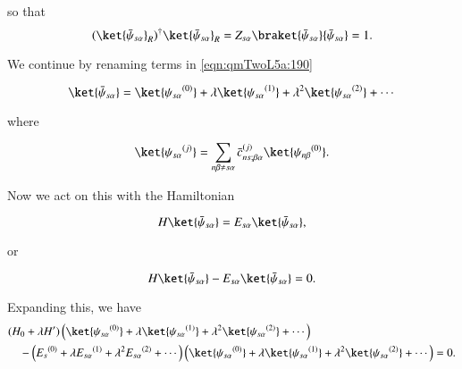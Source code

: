 so that
\begin{equation}\label{eqn:qmTwoL5a:270}
(\ket{\bar{\psi}_{s \alpha}}_R)^\dagger \ket{\bar{\psi}_{s \alpha}}_R = Z_{s \alpha} \braket{\bar{\psi}_{s \alpha}}{\bar{\psi}_{s \alpha}} = 1.
\end{equation}


We continue by renaming terms in \ref{eqn:qmTwoL5a:190}

\begin{equation}\label{eqn:qmTwoL5a:300}
\ket{\bar{\psi}_{s \alpha}} 
=
\ket{{\psi_{s \alpha}}^{(0)}} 
+ 
\lambda \ket{{\psi_{s \alpha}}^{(1)}} 
+ 
\lambda^2 \ket{{\psi_{s \alpha}}^{(2)}} 
+ \cdots
\end{equation}

where

\begin{equation}\label{eqn:qmTwoL5a:320}
\ket{{\psi_{s \alpha}}^{(j)}} = \sum_{n\beta \ne s\alpha} {\bar{c}_{ns;\beta \alpha}}^{(j)} \ket{{\psi_{n \beta}}^{(0)}}.
\end{equation}

Now we act on this with the Hamiltonian

\begin{equation}\label{eqn:qmTwoL5a:340}
H \ket{\bar{\psi}_{s \alpha}} = E_{s \alpha} \ket{\bar{\psi}_{s \alpha}},
\end{equation}

or

\begin{equation}\label{eqn:qmTwoL5a:360}
H \ket{\bar{\psi}_{s \alpha}} - E_{s \alpha} \ket{\bar{\psi}_{s \alpha}} = 0.
\end{equation}

Expanding this, we have
\begin{equation}\label{eqn:qmTwoL5a:380}
\begin{aligned}
&(H_0 + \lambda H') 
\left(
\ket{{\psi_{s \alpha}}^{(0)}} 
+ 
\lambda \ket{{\psi_{s \alpha}}^{(1)}} 
+ 
\lambda^2 \ket{{\psi_{s \alpha}}^{(2)}} 
+ \cdots
\right) \\
&\quad - 
\left( {E_s}^{(0)} + \lambda {E_{s \alpha}}^{(1)} + \lambda^2 {E_{s \alpha}}^{(2)} + \cdots \right)
\left(
\ket{{\psi_{s \alpha}}^{(0)}} 
+ 
\lambda \ket{{\psi_{s \alpha}}^{(1)}} 
+ 
\lambda^2 \ket{{\psi_{s \alpha}}^{(2)}} 
+ \cdots
\right)
= 0.
\end{aligned}
\end{equation}

